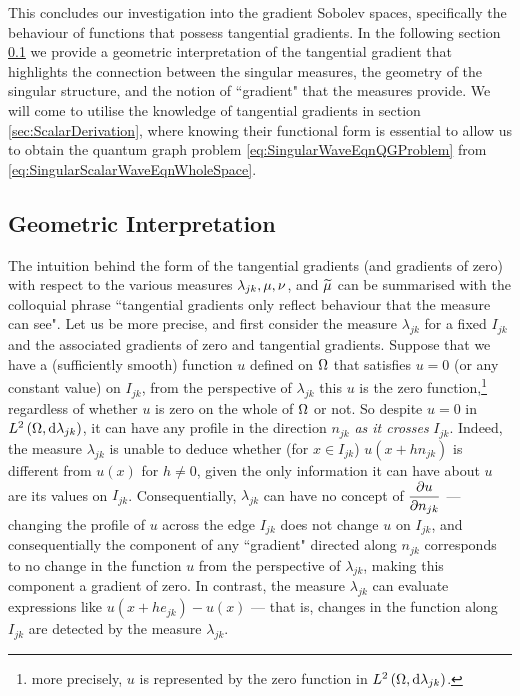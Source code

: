 This concludes our investigation into the gradient Sobolev spaces, specifically the behaviour of functions that possess tangential gradients.
In the following section \ref{ssec:3DGradGeometric} we provide a geometric interpretation of the tangential gradient that highlights the connection between the singular measures, the geometry of the singular structure, and the notion of ``gradient" that the measures provide.
We will come to utilise the knowledge of tangential gradients in section \ref{sec:ScalarDerivation}, where knowing their functional form is essential to allow us to obtain the quantum graph problem \eqref{eq:SingularWaveEqnQGProblem} from \eqref{eq:SingularScalarWaveEqnWholeSpace}.

\subsection{Geometric Interpretation} \label{ssec:3DGradGeometric}
The intuition behind the form of the tangential gradients (and gradients of zero) with respect to the various measures $\lambda_{jk}, \mu, \nu$, and $\widetilde{\mu}$ can be summarised with the colloquial phrase ``tangential gradients only reflect behaviour that the measure can see".
Let us be more precise, and first consider the measure $\lambda_{jk}$ for a fixed $I_{jk}$ and the associated gradients of zero and tangential gradients.
Suppose that we have a (sufficiently smooth) function $u$ defined on $\Omega$ that satisfies $u=0$ (or any constant value) on $I_{jk}$, from the perspective of $\lambda_{jk}$ this $u$ is the zero function,\footnote{more precisely, $u$ is represented by the zero function in $L^{2}\left( \Omega,\mathrm{d}\lambda_{jk} \right)$.} regardless of whether $u$ is zero on the whole of $\Omega$ or not.
So despite $u=0$ in $L^{2}\left( \Omega,\mathrm{d}\lambda_{jk} \right)$, it can have any profile in the direction $n_{jk}$ \emph{as it crosses} $I_{jk}$.
Indeed, the measure $\lambda_{jk}$ is unable to deduce whether (for $x\in I_{jk}$) $u(x+hn_{jk})$ is different from $u(x)$ for $h\neq0$, given the only information it can have about $u$ are its values on $I_{jk}$.
Consequentially, $\lambda_{jk}$ can have no concept of $\dfrac{\partial u}{\partial n_{jk}}$ --- changing the profile of $u$ across the edge $I_{jk}$ does not change $u$ on $I_{jk}$, and consequentially the component of any ``gradient" directed along $n_{jk}$ corresponds to no change in the function $u$ from the perspective of $\lambda_{jk}$, making this component a gradient of zero.
In contrast, the measure $\lambda_{jk}$ can evaluate expressions like $u(x+he_{jk})-u(x)$ --- that is, changes in the function along $I_{jk}$ are detected by the measure $\lambda_{jk}$.
